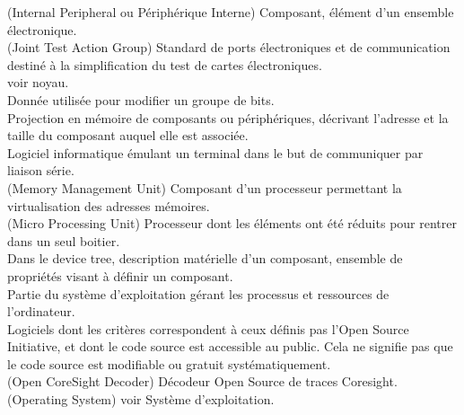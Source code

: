 \noindent
{} (Internal Peripheral ou Périphérique Interne) Composant, élément d'un
ensemble électronique. \\

\noindent
{} (Joint Test Action Group) Standard de ports électroniques et de
communication destiné à la simplification du test de cartes électroniques. \\

\noindent
{} voir noyau. \\

\noindent
{} Donnée utilisée pour modifier un groupe de bits. \\

\noindent
{} Projection en mémoire de composants ou périphériques,
décrivant l'adresse et la taille du composant auquel elle est associée. \\

\noindent
{} Logiciel informatique émulant un terminal dans le but de
communiquer par liaison série. \\

\noindent
{} (Memory Management Unit) Composant d'un processeur permettant la
virtualisation des adresses mémoires. \\

\noindent
{} (Micro Processing Unit) Processeur dont les éléments ont été
réduits pour rentrer dans un seul boitier. \\

\noindent
{} Dans le device tree, description matérielle d'un composant,
ensemble de propriétés visant à définir un composant. \\

\noindent
{} Partie du système d'exploitation gérant les processus et
ressources de l'ordinateur. \\

\noindent
{} Logiciels dont les critères correspondent à ceux définis
pas l'Open Source Initiative, et dont le code source est accessible au
public. Cela ne signifie pas que le code source est modifiable ou gratuit
systématiquement. \\

\noindent
{} (Open CoreSight Decoder) Décodeur Open Source de traces
Coresight. \\

\noindent
{} (Operating System) voir Système d'exploitation. \\

